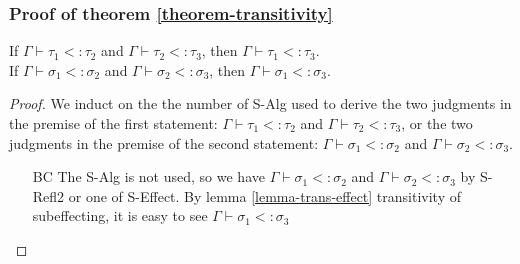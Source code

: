 \subsubsection{Proof of theorem \ref{theorem-transitivity}}
If $\Gamma \vdash \tau_1 <: \tau_2$ and $\Gamma \vdash \tau_2 <: \tau_3$, then $\Gamma \vdash \tau_1 <: \tau_3$. \\
If $\Gamma \vdash \sigma_1 <: \sigma_2$ and $\Gamma \vdash \sigma_2 <: \sigma_3$, then $\Gamma \vdash \sigma_1 <: \sigma_3$. 
\begin{proof}
We induct on the the number of S-Alg used to derive the two judgments in the premise of the first statement: $\Gamma \vdash \tau_1 <: \tau_2$ and $\Gamma \vdash \tau_2 <: \tau_3$, or the two judgments in the premise of the second statement: $\Gamma \vdash \sigma_1 <: \sigma_2$ and $\Gamma \vdash \sigma_2 <: \sigma_3$.
\begin{itemize}
\item[BC] The S-Alg is not used, so we have $\Gamma \vdash \sigma_1 <: \sigma_2$ and $\Gamma \vdash \sigma_2 <: \sigma_3$ by S-Refl2 or one of S-Effect.  By lemma \ref{lemma-trans-effect} transitivity of subeffecting, it is easy to see $\Gamma \vdash \sigma_1 <: \sigma_3$


\end{itemize}
\end{proof}
